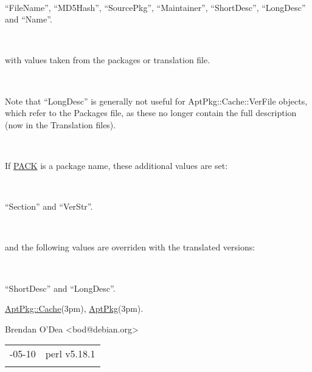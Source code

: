 \documentclass[]{article}
\renewcommand{\emph}[1]{\underline{#1}}
\begin{document}
~

``FileName'', ``MD5Hash'', ``SourcePkg'', ``Maintainer'', ``ShortDesc'',
``LongDesc'' and ``Name''.

~

with values taken from the packages or translation file.

~

Note that ``LongDesc'' is generally not useful for
AptPkg::Cache::VerFile objects, which refer to the Packages file, as
these no longer contain the full description (now in the Translation
files).

~

If \emph{PACK} is a package name, these additional values are set:

~

``Section'' and ``VerStr''.

~

and the following values are overriden with the translated versions:

~

``ShortDesc'' and ``LongDesc''.


\emph{AptPkg::Cache}(3pm), \emph{AptPkg}(3pm).


Brendan O'Dea \textless{}bod@debian.org\textgreater{}

\begin{longtable}[c]{@{}ll@{}}
\toprule\addlinespace
2013-05-10 & perl v5.18.1
\\\addlinespace
\bottomrule
\end{longtable}
\end{document}
